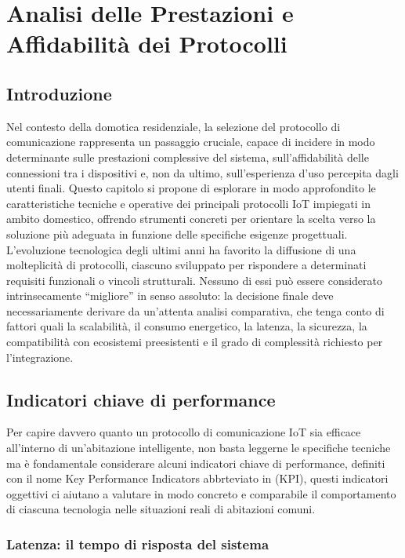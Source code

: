 \chapter{Analisi delle Prestazioni e Affidabilità dei Protocolli}

\section{Introduzione}

Nel contesto della domotica residenziale, la selezione del protocollo di comunicazione rappresenta un passaggio cruciale, capace di incidere in modo determinante sulle prestazioni complessive del sistema, sull’affidabilità delle connessioni tra i dispositivi e, non da ultimo, sull’esperienza d’uso percepita dagli utenti finali. Questo capitolo si propone di esplorare in modo approfondito le caratteristiche tecniche e operative dei principali protocolli IoT impiegati in ambito domestico, offrendo strumenti concreti per orientare la scelta verso la soluzione più adeguata in funzione delle specifiche esigenze progettuali.\\

L’evoluzione tecnologica degli ultimi anni ha favorito la diffusione di una molteplicità di protocolli, ciascuno sviluppato per rispondere a determinati requisiti funzionali o vincoli strutturali. Nessuno di essi può essere considerato intrinsecamente “migliore” in senso assoluto: la decisione finale deve necessariamente derivare da un’attenta analisi comparativa, che tenga conto di fattori quali la scalabilità, il consumo energetico, la latenza, la sicurezza, la compatibilità con ecosistemi preesistenti e il grado di complessità richiesto per l’integrazione.

\section{Indicatori chiave di performance}

Per capire davvero quanto un protocollo di comunicazione IoT sia efficace all’interno di un’abitazione intelligente, non basta leggerne le specifiche tecniche ma è fondamentale considerare alcuni indicatori chiave di performance, definiti con il nome Key Performance Indicators abbrteviato in  (KPI), questi indicatori oggettivi ci  aiutano a valutare in modo concreto e comparabile il comportamento di ciascuna tecnologia nelle situazioni reali di abitazioni comuni.

\subsection{Latenza: il tempo di risposta del sistema}

